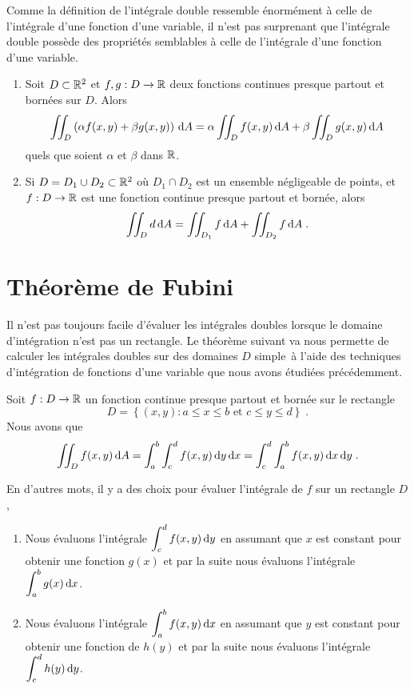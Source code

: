 {Comme la définition de l'intégrale double ressemble énormément à celle de
l'intégrale d'une fonction d'une variable, il n'est pas surprenant que
l'intégrale double possède des propriétés semblables à celle de l'intégrale
d'une fonction d'une variable.

\begin{prop}
\begin{enumerate}
\item Soit $D\subset \mathbb{R}^2$ et $f,g:D \rightarrow \mathbb{R}$ deux fonctions
continues presque partout et bornées sur $D$.  Alors
\[
\iint_D \left( \alpha f(x,y) + \beta g(x,y) \right) \,\mathrm{d}A =
\alpha \iint_D f(x,y) \,\mathrm{d}A + \beta \iint_D g(x,y) \,\mathrm{d}A
\]
quels que soient $\alpha$ et $\beta$ dans $\mathbb{R}$.
\item Si $D = D_1 \cup D_2 \subset \mathbb{R}^2$ où $D_1 \cap D_2$ est un
ensemble négligeable de points\footnotemark, et $f:D\rightarrow \mathbb{R}$
est une fonction continue presque partout et bornée, alors
\[
\iint_D d \,\mathrm{d}A = \iint_{D_1} f \,\mathrm{d}A + \iint_{D_2} f \,\mathrm{d}A \; .
\]
\end{enumerate}
\end{prop}


\section{Théorème de Fubini}

Il n'est pas toujours facile d'évaluer les intégrales doubles lorsque le
domaine d'intégra\-tion n'est pas un rectangle.  Le théorème suivant va nous
permette de calculer les intégrales doubles sur des domaines $D$ \flqq
simple\frqq\ à l'aide des techniques d'intégration de fonctions d'une
variable que nous avons étudiées précédemment.

\begin{theorem}
Soit $f:D\rightarrow \mathbb{R}$ un fonction continue presque partout et
bornée sur le rectangle
\[
D=\left\{(x,y): a\leq x \leq b \text{ et } c\leq y \leq d \right\} \; .
\]
Nous avons que
\[
\iint_D f(x,y) \,\mathrm{d}A = \int_a^b \int_c^d f(x,y) \,\mathrm{d}y \,\mathrm{d}x
= \int_c^d \int_a^b f(x,y) \,\mathrm{d}x \,\mathrm{d}y \; .
\]
\end{theorem}

En d'autres mots, il y a des choix pour évaluer l'intégrale de $f$ sur
un rectangle $D$,
\begin{enumerate}
\item Nous évaluons l'intégrale $\displaystyle \int_c^d f(x,y) \,\mathrm{d}y$ en
assumant que $x$ est constant pour obtenir une fonction $g(x)$ et par la
suite nous évaluons l'intégrale $\displaystyle \int_a^b g(x) \,\mathrm{d}x$.
\item Nous évaluons l'intégrale $\displaystyle \int_a^b f(x,y) \,\mathrm{d}x$ en
assumant que $y$ est constant pour obtenir une fonction de $h(y)$ et par la
suite nous évaluons l'intégrale $\displaystyle \int_c^d h(y) \,\mathrm{d}y$.
\end{enumerate}

}
